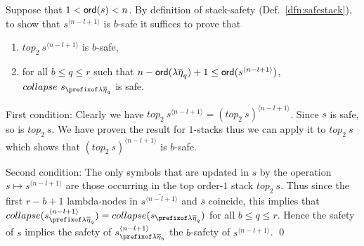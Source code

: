 \documentclass{article}
\theoremstyle{remark}
\theoremstyle{definition}
\newcommand\orddec\overline
\begin{document}
Suppose that $1<{\sf ord}(s)<n$.
By definition of stack-safety (Def.~\ref{dfn:safestack}), to show that $s^{\langle n-l+1 \rangle}$ is $b$-safe it suffices to prove that
\begin{enumerate}
\item $top_2~s^{\langle n-l+1 \rangle}$ is $b$-safe,
\item for all $b\leq q \leq r$ such that
$n-{\sf ord}(\lambda \overline{\eta}_{q}) +1 \leq {\sf ord}(s^{\langle n-l+1 \rangle})$, $collapse~s_{\prefixof \lambda \overline{\eta}_{q}}$ is safe.
\end{enumerate}

First condition: Clearly we have $top_2~s^{\langle n-l+1 \rangle} = (top_2~s)^{\langle n-l+1 \rangle}$. Since $s$ is safe, so is $top_2~s$. We have proven the result for $1$-stacks thus we can apply it to $top_2~s$ which shows that $(top_2~s)^{\langle n-l+1 \rangle}$ is $b$-safe.

Second condition: The only symbols that are updated in $s$ by the operation $s \mapsto s^{\langle n-l+1 \rangle}$ are those occurring in the top order-$1$ stack $top_2~s$. Thus since the first $r-b+1$ lambda-nodes in $\orddec{s^{\langle n-l+1 \rangle}}$ and $\orddec{s}$ coincide, this implies that $collapse(s^{\langle n-l+1 \rangle}_{\prefixof\lambda\overline\eta_q}) = collapse(s_{\prefixof\lambda\overline\eta_q})$ for all $b \leq q \leq r$.
Hence the safety of $s$ implies the safety of $s^{\langle n-l+1 \rangle}_{\prefixof\lambda\overline\eta_b}$ \ie the $b$-safety of $s^{\langle n-l+1 \rangle}$.
\qed
\smallskip
\end{document}
